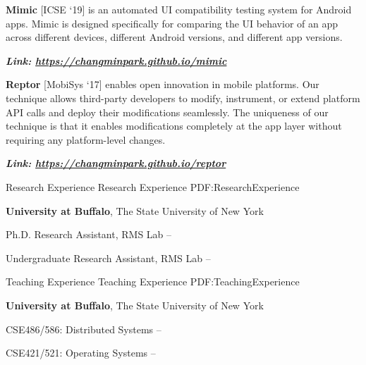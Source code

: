\documentclass[letterpaper,MMMyyyy,nonstopmode]{simpleresumecv}
\begin{document}
\begin{Body}
\vspace{0.5ex}
\Gap
\BulletItem
\textbf{Mimic} [ICSE `19] is an automated UI compatibility testing system for Android apps. 
Mimic is designed specifically for comparing the UI behavior of an app across different 
devices, different Android versions, and different app versions.

\hspace{2ex}
\textbf{\textit{Link: \href{https://changminpark.github.io/mimic}{https://changminpark.github.io/mimic}}}
\hfill

\vspace{0.5ex}
\Gap
\BulletItem
\textbf{Reptor} [MobiSys `17] enables open innovation in mobile platforms. Our technique allows third-party 
developers to modify, instrument, or extend platform API calls and deploy their modifications 
seamlessly. The uniqueness of our technique is that it enables modifications completely at 
the app layer without requiring any platform-level changes. 

\hspace{2ex}
\textbf{\textit{Link: \href{https://changminpark.github.io/reptor}{https://changminpark.github.io/reptor}}}
\hfill



\vspace{-0.7ex}
\Section
{Research Experience}
{Research Experience}
{PDF:ResearchExperience}

\Entry
\textbf{University at Buffalo}, The State University of New York

\Gap
\BulletItem
Ph.D. Research Assistant, RMS Lab
\hfill
{} --

\Gap
\BulletItem
Undergraduate Research Assistant, RMS Lab
\hfill
{} --


\vspace{-0.7ex}
\Section
{Teaching Experience}
{Teaching Experience}
{PDF:TeachingExperience}

\Entry
\textbf{University at Buffalo}, The State University of New York

\Gap
\BulletItem
CSE486/586: Distributed Systems
\hfill
{} --

\Gap
\BulletItem
CSE421/521: Operating Systems
\hfill
{} --




\end{Body}
\end{document}
